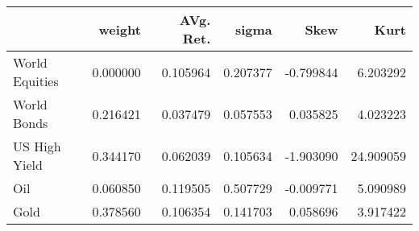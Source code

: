 \begin{tabular}{lrrrrr}
\toprule
{} &    weight &  AVg. Ret. &     sigma &      Skew &       Kurt \\
\midrule
World Equities &  0.000000 &   0.105964 &  0.207377 & -0.799844 &   6.203292 \\
World Bonds    &  0.216421 &   0.037479 &  0.057553 &  0.035825 &   4.023223 \\
US High Yield  &  0.344170 &   0.062039 &  0.105634 & -1.903090 &  24.909059 \\
Oil            &  0.060850 &   0.119505 &  0.507729 & -0.009771 &   5.090989 \\
Gold           &  0.378560 &   0.106354 &  0.141703 &  0.058696 &   3.917422 \\
\bottomrule
\end{tabular}

